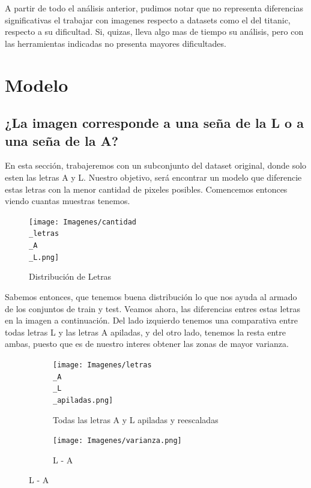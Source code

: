 \documentclass[10pt,a4paper]{article}
\begin{document}
A partir de todo el análisis anterior, pudimos notar que no representa diferencias significativas el trabajar con imagenes respecto a datasets como el del titanic, respecto a su dificultad. Si, quizas, lleva algo mas de tiempo su análisis, pero con las herramientas indicadas no presenta mayores dificultades.

\vspace{0.1cm}


\section{Modelo}

\subsection{¿La imagen corresponde a una seña de la L o a una seña de la A?} \vspace{0.1cm}

En esta sección, trabajeremos con un subconjunto del dataset original, donde solo esten las letras A  y L. Nuestro objetivo, será encontrar un modelo que
diferencie estas letras con la menor cantidad de pixeles posibles. Comencemos entonces viendo cuantas muestras tenemos. 

\begin{figure}[h]
	\centering
  \texttt{[image: Imagenes/cantidad\\\_letras\\\_A\\\_L.png]}
  \caption{Distribución de Letras}
  \label{fig:Tabla 6}
\end{figure}

Sabemos entonces, que tenemos buena distribución lo que nos ayuda al armado de los conjuntos de train y test. Veamos ahora, las diferencias entres estas letras en la imagen a continuación.  Del lado izquierdo tenemos una comparativa entre todas letras L y las letras A apiladas, y del otro lado, tenemos la resta entre ambas, puesto que es de nuestro interes obtener las zonas de mayor varianza.

\newpage

\begin{figure}[ht!]
	\begin{subfigure}{0.5\textwidth}
		\centering
		\texttt{[image: Imagenes/letras\\\_A\\\_L\\\_apiladas.png]} 
		\caption{Todas las letras A y L apiladas y reescaladas}
		\label{fig:subfig1}
	\end{subfigure}
	\begin{subfigure}{0.55\textwidth}
		\texttt{[image: Imagenes/varianza.png]}
		\caption{L - A}
		\label{fig:subfig2}
	\end{subfigure}
	\label{fig:subfigs}
\end{figure}
\end{document}
